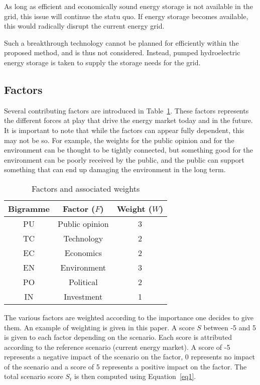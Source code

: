 \documentclass[IJPHM, 2017, 29]{PHMSociety}
\begin{document}
As long as efficient and economically sound energy storage is not available in the grid, this issue will continue the statu quo. If energy storage becomes available, this would radically disrupt the current energy grid.

Such a breakthrough technology cannot be planned for efficiently within the proposed method, and is thus not considered. Instead, pumped hydroelectric energy storage is taken to supply the storage needs for the grid.

\subsection{Factors}

Several contributing factors are introduced in Table~\ref{tab1}. These factors represents the different forces at play that drive the energy market today and in the future. It is important to note that while the factors can appear fully dependent, this may not be so. For example, the weights for the public opinion and for the environment can be thought to be tightly connected, but something good for the environment can be poorly received by the public, and the public can support something that can end up damaging the environment in the long term.

\setlength\extrarowheight{5pt}
\begin{table}[]
\centering
\caption{Factors and associated weights}
\label{tab1}
\begin{tabular}{|c|c|c|}
\hline
Bigramme & Factor ($F$)               & Weight ($W$) \\ \hline
PU & Public opinion           & 3      \\ \hline
TC & Technology               & 2      \\ \hline
EC & Economics                & 2      \\ \hline
EN & Environment              & 3      \\ \hline
PO & Political                & 2      \\ \hline
IN & Investment               & 1      \\ \hline
\end{tabular}
\end{table}

The various factors are weighted according to the importance one decides to give them. An example of weighting is given in this paper. A score $S$ between -5 and 5 is given to each factor depending on the scenario. Each score is attributed according to the reference scenario (current energy market). A score of -5 represents a negative impact of the scenario on the factor, 0 represents no impact of the scenario and a score of 5 represents a positive impact on the factor. The total scenario score $S_t$ is then computed using Equation~\ref{eq1}.
\end{document}
